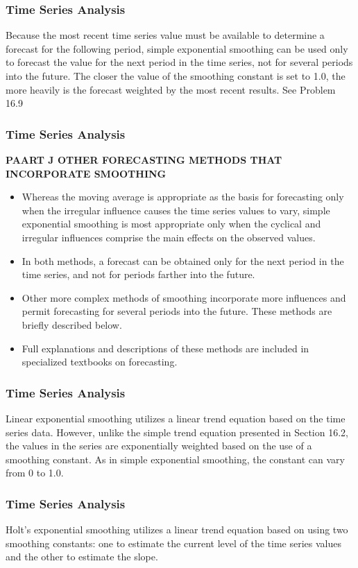 \begin{frame}
\frametitle{Time Series Analysis}
Because the most recent time series value must be available to determine a forecast for the following
period, simple exponential smoothing can be used only to forecast the value for the next period in the time
series, not for several periods into the future. The closer the value of the smoothing constant is set to 1.0, the
more heavily is the forecast weighted by the most recent results. See Problem 16.9
\end{frame}
\begin{frame}
\frametitle{Time Series Analysis}
\textbf{PAART J OTHER FORECASTING METHODS THAT INCORPORATE SMOOTHING}
\begin{itemize}
\item Whereas the moving average is appropriate as the basis for forecasting only when the irregular influence
causes the time series values to vary, simple exponential smoothing is most appropriate only when the cyclical
and irregular influences comprise the main effects on the observed values.
\item  In both methods, a forecast can be
obtained only for the next period in the time series, and not for periods farther into the future. 
\item Other
more complex methods of smoothing incorporate more influences and permit forecasting for several periods
into the future. These methods are briefly described below.
\item Full explanations and descriptions of these methods
are included in specialized textbooks on forecasting.
\end{itemize}
\end{frame}
\begin{frame}
\frametitle{Time Series Analysis}

Linear exponential smoothing utilizes a linear trend equation based on the time series data. However,
unlike the simple trend equation presented in Section 16.2, the values in the series are exponentially weighted
based on the use of a smoothing constant. As in simple exponential smoothing, the constant can vary from
0 to 1.0.
\end{frame}
\begin{frame}
\frametitle{Time Series Analysis}
Holt’s exponential smoothing utilizes a linear trend equation based on using two smoothing constants: one
to estimate the current level of the time series values and the other to estimate the slope.
\end{frame}
